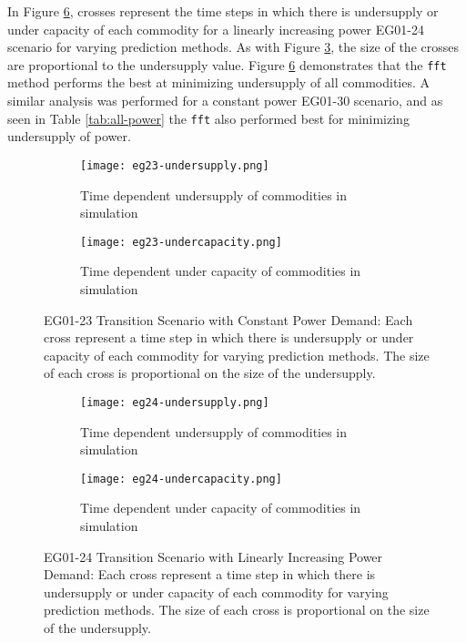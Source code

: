 In Figure \ref{fig:eg24under}, crosses represent the time steps in which there is undersupply 
or under capacity of each commodity for a linearly increasing power EG01-24 
scenario for varying prediction methods.
As with Figure \ref{fig:eg23under}, the size of the crosses are 
proportional to the undersupply value. 
Figure \ref{fig:eg24under} demonstrates that the \texttt{fft} method 
performs the best at minimizing undersupply of all commodities.
A similar analysis was performed for a constant power EG01-30 scenario, and 
as seen in Table \ref{tab:all-power} the \texttt{fft} also performed 
best for minimizing undersupply of power. 

\begin{figure}[]
	\centering
	\begin{subfigure}[t]{1.2\textwidth}
		\centering
		\texttt{[image: eg23-undersupply.png]} 
		\caption{Time dependent undersupply of commodities in simulation }
		\label{fig:23undersupply}
	\end{subfigure}
	\vspace{1cm}
	\begin{subfigure}[t]{1.2\textwidth}
		\centering
		\texttt{[image: eg23-undercapacity.png]} 
		\caption{Time dependent under capacity of commodities in simulation }
		\label{fig:23undercapacity}
	\end{subfigure}
	\hfill
	\caption{
	EG01-23 Transition Scenario with Constant Power Demand: 
	Each cross represent a time step in which there is undersupply 
	or under capacity of each commodity for varying prediction methods. 
	The size of each cross is proportional on the size of the undersupply.}
	\label{fig:eg23under}
\end{figure}

\begin{figure}[]
	\centering
	\begin{subfigure}[t]{1.2\textwidth}
		\centering
		\texttt{[image: eg24-undersupply.png]} 
		\caption{Time dependent undersupply of commodities in simulation }
		\label{fig:24undersupply}
	\end{subfigure}
	\vspace{1cm}
	\begin{subfigure}[t]{1.2\textwidth}
		\centering
		\texttt{[image: eg24-undercapacity.png]} 
		\caption{Time dependent under capacity of commodities in simulation }
		\label{fig:24undercapacity}
	\end{subfigure}
	\hfill
	\caption{
	EG01-24 Transition Scenario with Linearly Increasing Power Demand:
	Each cross represent a time step in which there is undersupply 
	or under capacity of each commodity for varying prediction methods. 
	The size of each cross is proportional on the size of the undersupply.}
	\label{fig:eg24under}
\end{figure}

